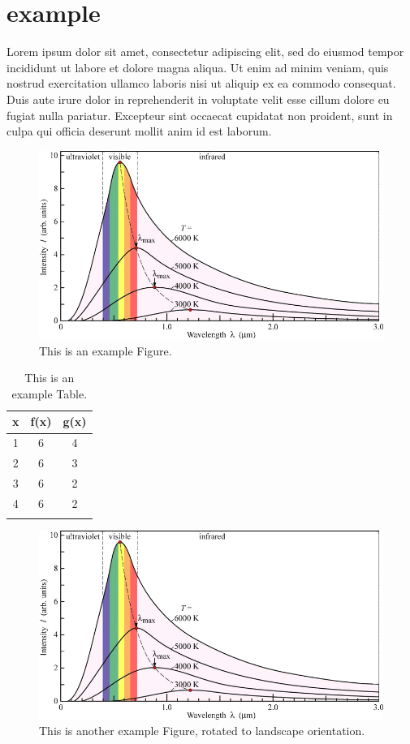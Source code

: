 \chapter{example}
Lorem ipsum dolor sit amet, consectetur adipiscing elit, sed do eiusmod tempor incididunt ut labore et dolore magna aliqua. Ut enim ad minim veniam, quis nostrud exercitation ullamco laboris nisi ut aliquip ex ea commodo consequat. Duis aute irure dolor in reprehenderit in voluptate velit esse cillum dolore eu fugiat nulla pariatur. Excepteur sint occaecat cupidatat non proident, sunt in culpa qui officia deserunt mollit anim id est laborum.

\begin{figure}
	\includegraphics[width=\textwidth]{figures/exampleFigure.png}
	\caption{This is an example Figure.}
	\label{Figure in Chapter 1}
\end{figure}


\begin{table}
\caption{This is an example Table.}
\begin{center}
\begin{tabular}{ccc}
x & f(x) & g(x) \\
\hline
1 & 6 & 4  \\
2 & 6 & 3  \\
3 & 6 & 2  \\
4 & 6 & 2  \\
\label{Table in Chapter 1}
\end{tabular}
\end{center}
\end{table}

\begin{figure}
\includegraphics[width=\textwidth]{figures/exampleFigure.png}
\caption{This is another example Figure, rotated to landscape orientation.}
\label{LandscapeFigure}
\end{figure}